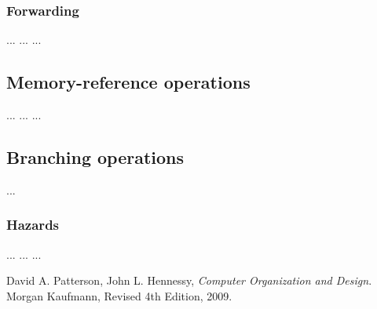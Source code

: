 \documentclass[11pt,twoside,a4paper]{article}
\begin{document}
\subsubsection{Forwarding}
\begin{multicols}{2}
\noindent ...
\vfill
\columnbreak
...
\lstset{language=[mips]Assembler}
% 
...
\end{multicols}

\subsection{Memory-reference operations}
\begin{multicols}{2}
\noindent ...
\vfill
\columnbreak
...
\lstset{language=[mips]Assembler}
% 
...
\end{multicols}

\subsection{Branching operations}
...

\subsubsection{Hazards}
\begin{multicols}{2}
\noindent ...
\vfill
\columnbreak
...
\lstset{language=[mips]Assembler}
% 
...
\end{multicols}

\newpage
\pagestyle{fancy}
\begin{thebibliography}{9}

  David A. Patterson, John L. Hennessy,
  \emph{Computer Organization and Design}.
  Morgan Kaufmann,
  Revised 4th Edition,
  2009.

\end{thebibliography}
\end{document}
